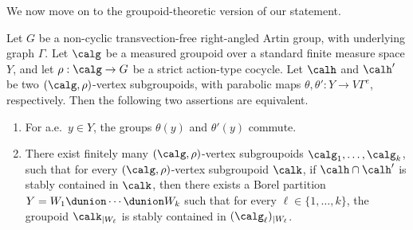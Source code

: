 We now move on to the groupoid-theoretic version of our statement.

\begin{lemma}\label{lemma:adjacency-groupoids}
Let $G$ be a non-cyclic transvection-free right-angled Artin group, with underlying graph $\Gamma$. Let $\calg$ be a measured groupoid over a standard finite measure space $Y$, and let $\rho:\calg\to G$ be a strict action-type cocycle. Let $\calh$ and $\calh'$ be two $(\calg,\rho)$-vertex subgroupoids, with parabolic maps $\theta,\theta':Y\to V\Gamma^e$, respectively. Then the following two assertions are equivalent.
\begin{enumerate}
\item\label{lemma:adjacency-groupoids1} For a.e.\ $y\in Y$, the groups $\theta(y)$ and $\theta'(y)$ commute.
\item\label{lemma:adjacency-groupoids2} There exist finitely many $(\calg,\rho)$-vertex subgroupoids $\calg_1,\dots,\calg_k$, such that for every $(\calg,\rho)$-vertex subgroupoid $\calk$, if $\calh\cap\calh'$ is stably contained in $\calk$, then there exists a Borel partition $Y=W_1\dunion \cdots\dunion W_k$ such that for every $\ell\in\{1,\dots,k\}$, the groupoid $\calk_{|W_\ell}$ is stably contained in $(\calg_\ell)_{|W_\ell}$.
\end{enumerate}
\end{lemma}

